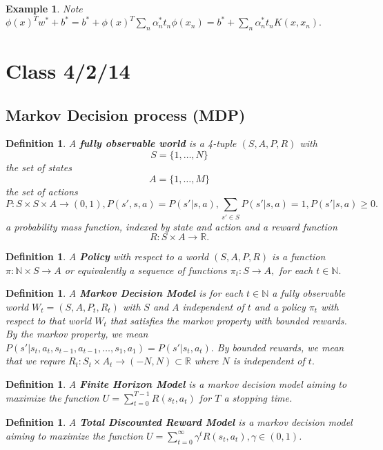 \documentclass{amsart}
\newtheorem{defn}[subsubsection]{Definition}
\newtheorem{eg}[subsection]{Example}
\newcommand\ssec{\subsection}
\begin{document}
\begin{eg}
Note $\phi(x)^Tw^* + b^* = b^* + \phi(x)^T \sum_n \alpha_n^* t_n \phi(x_n) = b^*+\sum_n \alpha_n^* t_n K(x,x_n).$
\end{eg}

\section{Class 4/2/14}

\ssec{Markov Decision process (MDP)}

\begin{defn}
A {\bf fully observable world} is a 4-tuple $(S,A,P,R)$ with
$$S = \{1, \ldots, N\}$$ the set of states
$$A = \{1,\ldots, M\}$$ the set of actions
$$P:S\times S\times A \rightarrow (0,1), P(s',s,a) = P(s'|s,a), \sum_{s' \in S} P(s'|s,a) = 1, P(s'|s,a) \geq 0.$$ a probability mass function, indexed by state and action
and a reward function
$$R:S \times A \rightarrow \mathbb R.$$
\end{defn}

\begin{defn}
A {\bf Policy} with respect to a world $(S,A,P,R)$ is a function $\pi: \mathbb N \times S \rightarrow A$ or equivalently a sequence of functions $\pi_t:S \rightarrow A,$ for each $t \in \mathbb N.$
\end{defn}

\begin{defn}
A {\bf Markov Decision Model} is for each $t \in \mathbb N$ a fully observable world $W_t=(S,A,P_t,R_t)$ with $S$ and $A$ independent of $t$ and a policy $\pi_t$ with respect to that world $W_t$ that satisfies the markov property with bounded rewards. By the markov property, we mean $P(s'|s_t,a_t,s_{t-1},a_{t-1},\ldots, s_1,a_1) = P(s'|s_t,a_t).$ By bounded rewards, we mean that we requre $R_t:S_t\times A_t \rightarrow (-N,N) \subset \mathbb R$ where $N$ is independent of $t.$
\end{defn}

\begin{defn}
A {\bf Finite Horizon Model} is a markov decision model aiming to maximize the function $U = \sum_{t = 0}^{T-1} R(s_t,a_t)$ for $T$ a stopping time.
\end{defn}

\begin{defn}
A {\bf Total Discounted Reward Model} is a markov decision model aiming to maximize the function $U = \sum_{t = 0}^{\infty} \gamma^t R(s_t,a_t), \gamma \in (0,1)$.
\end{defn}
\end{document}
